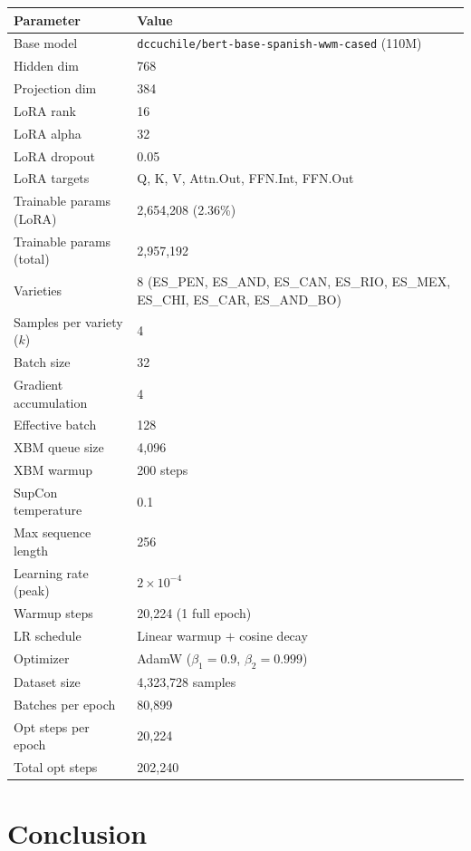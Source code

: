 \documentclass[11pt,a4paper]{article}
\begin{document}
\begin{table}[H]
\centering
\begin{tabular}{@{}ll@{}}
\toprule
\textbf{Parameter} & \textbf{Value} \\
\midrule
Base model & \texttt{dccuchile/bert-base-spanish-wwm-cased} (110M) \\
Hidden dim & 768 \\
Projection dim & 384 \\
LoRA rank & 16 \\
LoRA alpha & 32 \\
LoRA dropout & 0.05 \\
LoRA targets & Q, K, V, Attn.Out, FFN.Int, FFN.Out \\
Trainable params (LoRA) & 2{,}654{,}208 (2.36\%) \\
Trainable params (total) & 2{,}957{,}192 \\
Varieties & 8 (ES\_PEN, ES\_AND, ES\_CAN, ES\_RIO, ES\_MEX, ES\_CHI, ES\_CAR, ES\_AND\_BO) \\
Samples per variety ($k$) & 4 \\
Batch size & 32 \\
Gradient accumulation & 4 \\
Effective batch & 128 \\
XBM queue size & 4{,}096 \\
XBM warmup & 200 steps \\
SupCon temperature & 0.1 \\
Max sequence length & 256 \\
Learning rate (peak) & $2 \times 10^{-4}$ \\
Warmup steps & 20{,}224 (1 full epoch) \\
LR schedule & Linear warmup $+$ cosine decay \\
Optimizer & AdamW ($\beta_1 = 0.9$, $\beta_2 = 0.999$) \\
Dataset size & 4{,}323{,}728 samples \\
Batches per epoch & 80{,}899 \\
Opt steps per epoch & 20{,}224 \\
Total opt steps & 202{,}240 \\
\bottomrule
\end{tabular}
\end{table}


\section{Conclusion}
\end{document}
